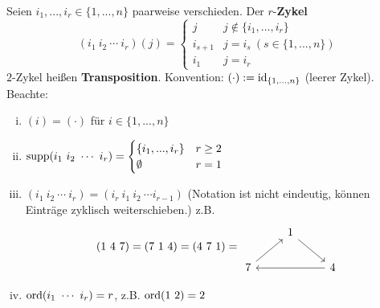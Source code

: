 \documentclass[a4paper]{report}
\begin{document}
\begin{defi}
  Seien $i_{1}, ..., i_{r} \in \{1, ..., n\}$ paarweise verschieden. Der $r$-\textbf{Zykel} \[(i_{1} \ i_{2}\ \cdots \ i_{r})(j) =
  \begin{cases}
    j & j \notin \{i_{1}, ..., i_{r}\} \\
    i_{s+1} & j = i_{s} \ (s \in \{1, ..., n\}) \\
    i_{1} & j = i_{r}
  \end{cases}\]
$2$-Zykel heißen \textbf{Transposition}.
Konvention: $( \cdot ):= \operatorname{id}_{\{1, ..., n\}}$ (leerer Zykel).
Beachte:
\begin{enumerate}[(i)]
  \item $(i) = (\cdot)$ für $i \in \{1, ..., n\}$
  \item $\operatorname{supp}(i_{1} \ i_{2} \ \cdots \ i_{r}) =
        \begin{cases}
          \{i_{1}, ..., i_{r}\} & r \ge 2 \\
          \emptyset & r =1
        \end{cases}$
  \item $(i_{1} \ i_{2}\ \cdots \ i_{r}) = (i_{r} \ i_{1} \ i_{2} \ \cdots i_{r-1})$ (Notation ist nicht eindeutig, können Einträge zyklisch weiterschieben.)
        z.B.
        \[(1 \ 4\ 7) = (7\ 1\ 4) = (4\ 7\ 1)
= \begin{tikzcd}
             & 1 \arrow[rd] &              \\
7 \arrow[ru] &              & 4 \arrow[ll]
\end{tikzcd}
        \]
  \item $\operatorname{ord}(i_{1}\ \cdots \ i_{r}) = r$, z.B. $\operatorname{ord}(1 \ 2) = 2$
\end{enumerate}
\end{defi}
\end{document}
